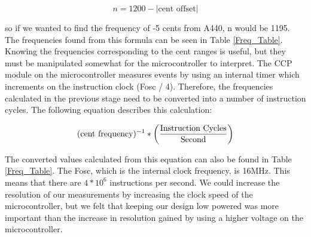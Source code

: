 \documentclass[12pt]{article}
\begin{document}
\begin{equation}
n = 1200 - |\mbox{cent offset}|
\end{equation}

so if we wanted to find the frequency of -5 cents from A440, n would be 1195. The frequencies found
from this formula can be seen in Table \ref{Freq_Table}. Knowing the frequencies corresponding to the cent ranges
is useful, but they must be manipulated somewhat for the microcontroller to interpret. The CCP module
on the microcontroller measures events by using an internal timer which increments on the instruction
clock (Fosc / 4). Therefore, the frequencies calculated in the previous stage need to be converted into a
number of instruction cycles. The following equation describes this calculation:

\begin{equation}
(\mbox{cent frequency})^{-1} * \left({ \mbox{Instruction Cycles} \over \mbox{Second}}\right)
\end{equation}

The converted values calculated from this equation can also be found in Table \ref{Freq_Table}. The Fosc, which is the
internal clock frequency, is 16MHz. This means that there are $4 *10^6$ instructions per second. We could
increase the resolution of our measurements by increasing the clock speed of the microcontroller, but
we felt that keeping our design low powered was more important than the increase in resolution gained
by using a higher voltage on the microcontroller.
\end{document}
